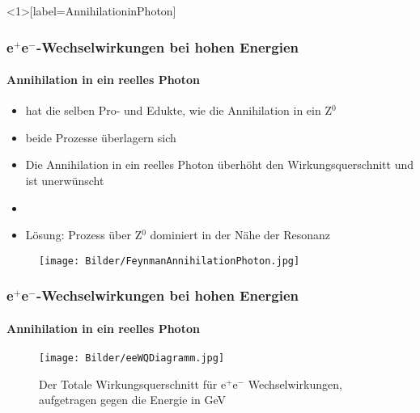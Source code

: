 \documentclass{beamer}
\newcommand{\citeS}[1]{\textsuperscript{\cite{#1}}}
\begin{document}
\begin{frame}<1>[label=AnnihilationinPhoton]
	\frametitle{e$^+$e$^-$-Wechselwirkungen bei hohen Energien}
	\framesubtitle{Annihilation in ein reelles Photon}
	\begin{itemize}
		\item hat die selben Pro- und Edukte, wie die Annihilation in ein Z$^0$
		\item<2->[$ \rightarrow $] beide Prozesse überlagern sich
		\item<2->[$ \rightarrow $] Die Annihilation in ein reelles Photon überhöht den Wirkungsquerschnitt und ist unerwünscht
		\item[] 
		\item<3> Lösung: Prozess über Z$^0$ dominiert in der Nähe der Resonanz
	\end{itemize}
	\begin{figure}
	\centering
	\texttt{[image: Bilder/FeynmanAnnihilationPhoton.jpg]}
	\end{figure}
\end{frame}
\begin{frame}
	\frametitle{e$^+$e$^-$-Wechselwirkungen bei hohen Energien}
	\framesubtitle{Annihilation in ein reelles Photon}
	\begin{figure}
	\centering
	\caption{Der Totale Wirkungsquerschnitt für e$ ^{+} $e$ ^{-}$ Wechselwirkungen, aufgetragen gegen die Energie in GeV\citeS{eeWQDiagramm}}
	\texttt{[image: Bilder/eeWQDiagramm.jpg]}
	\end{figure}
\end{frame}
\end{document}
